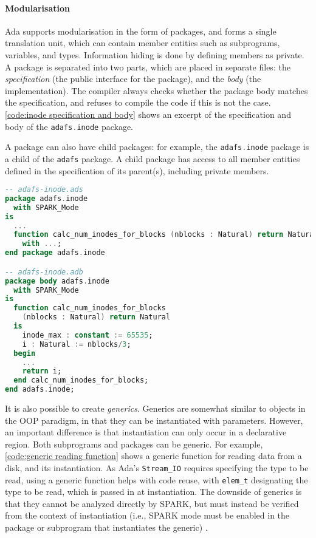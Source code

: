 \paragraph{Modularisation}
Ada supports modularisation in the form of packages, and forms a single translation unit, which can contain member entities such as subprograms, variables, and types.
Information hiding is done by defining members as private.
A package is separated into two parts, which are placed in separate files: the \textit{specification} (the public interface for the package), and the \textit{body} (the implementation).
The compiler always checks whether the package body matches the specification, and refuses to compile the code if this is not the case.
\autoref{code:inode specification and body} shows an excerpt of the specification and body of the \lstinline[language=Ada]{adafs.inode} package.

A package can also have child packages: for example, the \lstinline[language=Ada]{adafs.inode} package is a child of the \lstinline[language=Ada]{adafs} package.
A child package has access to all member entities defined in the specification of its parent(s), including private members.

\begin{lstlisting}[caption={Excerpt from the adafs.inode package specification and body (ellipses denote code omitted for brevity)}, label={code:inode specification and body}, language=Ada]
-- adafs-inode.ads
package adafs.inode
  with SPARK_Mode
is
  ...
  function calc_num_inodes_for_blocks (nblocks : Natural) return Natural
    with ...;
end package adafs.inode

-- adafs-inode.adb
package body adafs.inode
  with SPARK_Mode
is
  function calc_num_inodes_for_blocks
    (nblocks : Natural) return Natural
  is
    inode_max : constant := 65535;
    i : Natural := nblocks/3;
  begin
    ...
    return i;
  end calc_num_inodes_for_blocks;
end adafs.inode;
\end{lstlisting}

It is also possible to create \textit{generics}.
Generics are somewhat similar to objects in the OOP paradigm, in that they can be instantiated with parameters.
However, an important difference is that instantiation can only occur in a declarative region.
Both subprograms and packages can be generic.
For example, \autoref{code:generic reading function} shows a generic function for reading data from a disk, and its instantiation.
As Ada's \lstinline[language=Ada]{Stream_IO} requires specifying the type to be read, using a generic function helps with code reuse, with \lstinline[language=Ada]{elem_t} designating the type to be read, which is passed in at instantiation.
The downside of generics is that they cannot be analyzed directly by SPARK, but must instead be verified from the context of instantiation (i.e., SPARK mode must be enabled in the package or subprogram that instantiates the generic) \cite{sparkRM}.

